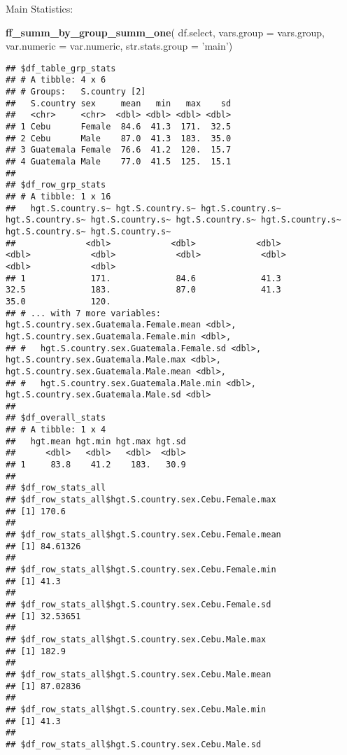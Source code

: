 \documentclass[
]{book}
\newenvironment{Shaded}{\begin{snugshade}}{\end{snugshade}}
\newcommand{\DataTypeTok}[1]{\textcolor[rgb]{0.13,0.29,0.53}{#1}}
\newcommand{\KeywordTok}[1]{\textcolor[rgb]{0.13,0.29,0.53}{\textbf{#1}}}
\newcommand{\NormalTok}[1]{#1}
\newcommand{\StringTok}[1]{\textcolor[rgb]{0.31,0.60,0.02}{#1}}
\begin{document}
Main Statistics:

\begin{Shaded}
\begin{Highlighting}[]
\KeywordTok{ff_summ_by_group_summ_one}\NormalTok{(}
\NormalTok{  df.select, }\DataTypeTok{vars.group =}\NormalTok{ vars.group, }\DataTypeTok{var.numeric =}\NormalTok{ var.numeric, }
  \DataTypeTok{str.stats.group =} \StringTok{'main'}\NormalTok{)}
\end{Highlighting}
\end{Shaded}

\begin{verbatim}
## $df_table_grp_stats
## # A tibble: 4 x 6
## # Groups:   S.country [2]
##   S.country sex     mean   min   max    sd
##   <chr>     <chr>  <dbl> <dbl> <dbl> <dbl>
## 1 Cebu      Female  84.6  41.3  171.  32.5
## 2 Cebu      Male    87.0  41.3  183.  35.0
## 3 Guatemala Female  76.6  41.2  120.  15.7
## 4 Guatemala Male    77.0  41.5  125.  15.1
## 
## $df_row_grp_stats
## # A tibble: 1 x 16
##   hgt.S.country.s~ hgt.S.country.s~ hgt.S.country.s~ hgt.S.country.s~ hgt.S.country.s~ hgt.S.country.s~ hgt.S.country.s~ hgt.S.country.s~ hgt.S.country.s~
##              <dbl>            <dbl>            <dbl>            <dbl>            <dbl>            <dbl>            <dbl>            <dbl>            <dbl>
## 1             171.             84.6             41.3             32.5             183.             87.0             41.3             35.0             120.
## # ... with 7 more variables: hgt.S.country.sex.Guatemala.Female.mean <dbl>, hgt.S.country.sex.Guatemala.Female.min <dbl>,
## #   hgt.S.country.sex.Guatemala.Female.sd <dbl>, hgt.S.country.sex.Guatemala.Male.max <dbl>, hgt.S.country.sex.Guatemala.Male.mean <dbl>,
## #   hgt.S.country.sex.Guatemala.Male.min <dbl>, hgt.S.country.sex.Guatemala.Male.sd <dbl>
## 
## $df_overall_stats
## # A tibble: 1 x 4
##   hgt.mean hgt.min hgt.max hgt.sd
##      <dbl>   <dbl>   <dbl>  <dbl>
## 1     83.8    41.2    183.   30.9
## 
## $df_row_stats_all
## $df_row_stats_all$hgt.S.country.sex.Cebu.Female.max
## [1] 170.6
## 
## $df_row_stats_all$hgt.S.country.sex.Cebu.Female.mean
## [1] 84.61326
## 
## $df_row_stats_all$hgt.S.country.sex.Cebu.Female.min
## [1] 41.3
## 
## $df_row_stats_all$hgt.S.country.sex.Cebu.Female.sd
## [1] 32.53651
## 
## $df_row_stats_all$hgt.S.country.sex.Cebu.Male.max
## [1] 182.9
## 
## $df_row_stats_all$hgt.S.country.sex.Cebu.Male.mean
## [1] 87.02836
## 
## $df_row_stats_all$hgt.S.country.sex.Cebu.Male.min
## [1] 41.3
## 
## $df_row_stats_all$hgt.S.country.sex.Cebu.Male.sd

\end{verbatim}
\end{document}
